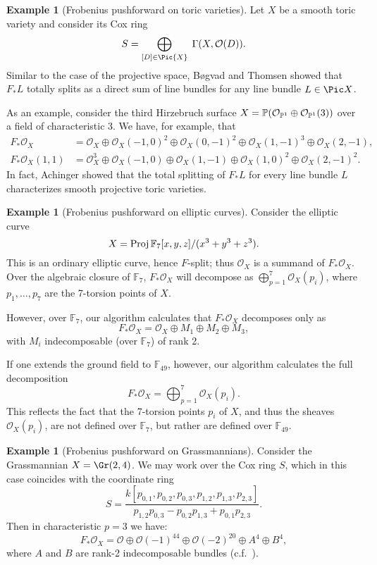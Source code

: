 \documentclass[12pt]{article}
\def\OO{\mathcal O}
\def\FF{\mathbb F}
\theoremstyle{theorem}
\numberwithin{thm}{section}
\theoremstyle{definition}
\newtheorem{exa}[thm]{Example}
\begin{document}
\begin{exa}[Frobenius pushforward on toric varieties]
  Let $X$ be a smooth toric variety and consider its Cox ring
  \[ S = \bigoplus_{[D]\in\Pic{X}} \; \Gamma(X, \OO(D)). \]
  Similar to the case of the projective space, B{\o}gvad and Thomsen \cite{Bogvad98,Thomsen00} showed that $F_*L$ totally splits as a direct sum of line bundles for any line bundle $L\in\Pic X$.

  As an example, consider the third Hirzebruch surface $X=\P(\OO_{\P^1}\oplus \OO_{\P^1}(3))$ over a field of characteristic 3. We have, for example, that
  \begin{align*}
    F_*\OO_X      &= \OO_X   \oplus \OO_X(-1,0)^2 \oplus \OO_X(0,-1)^2 \oplus \OO_X(1,-1)^3 \oplus \OO_X(2,-1), \\
    F_*\OO_X(1,1) &= \OO_X^3 \oplus \OO_X(-1,0)   \oplus \OO_X(1,-1)   \oplus \OO_X(1, 0)^2 \oplus \OO_X(2,-1)^2.
  \end{align*}
  In fact, Achinger \cite{Achinger15} showed that the total splitting of $F_*L$ for every line bundle $L$ characterizes smooth projective toric varieties.
\end{exa}

\begin{exa}[Frobenius pushforward on elliptic curves]\label{ex:elliptic}
  Consider the elliptic curve
  \[ X = \Proj \FF_7[x,y,z]/(x^3+y^3+z^3). \]
  This is an ordinary elliptic curve, hence $F$-split; thus $\OO_X$ is a summand of $F_* \OO_X$. Over the algebraic closure of $\FF_7$, $F_*\OO_X$ will decompose as $\bigoplus_{p=1}^7 \OO_X(p_i)$, where $p_1,\dots,p_7$ are the 7-torsion points of $X$.

  However, over $\FF_7$, our algorithm calculates that $F_*\OO_X$ decomposes only as
  $$ F_* \OO_X =\OO_X \oplus M_1\oplus M_2\oplus M_3, $$
  with $M_i$ indecomposable (over $\FF_7$) of rank 2.

  If one extends the ground field to $\FF_{49}$, however, our algorithm calculates the full decomposition
  $$ F_* \OO_X=\bigoplus_{p=1}^7 \OO_X(p_i). $$
  This reflects the fact that the 7-torsion points $p_i$ of $X$, and thus the sheaves $\OO_X(p_i)$, are not defined over $\FF_7$, but rather are defined over $\FF_{49}$.
\end{exa}

\begin{exa}[Frobenius pushforward on Grassmannians]
  Consider the Grassmannian $X = \Gr(2,4)$. We may work over the Cox ring $S$,
  which in this case coincides with the coordinate ring
  \[ S = \frac{k[p_{0,1},p_{0,2},p_{0,3},p_{1,2},p_{1,3},p_{2,3}]}{p_{1,2}p_{0,3}-p_{0,2}p_{1,3}+p_{0,1}p_{2,3}}. \]
  Then in characteristic $p=3$ we have:
  \[ F_*\OO_X = \OO \oplus \OO(-1)^{44} \oplus \OO(-2)^{20} \oplus A^4 \oplus B^4, \]
  where $A$ and $B$ are rank-2 indecomposable bundles (c.f.~\cite{RSVdB22}).
\end{exa}
\end{document}
